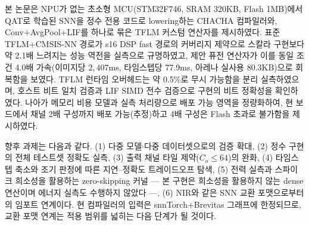 \label{sec:conclusion}

본 논문은 NPU가 없는 초소형 MCU(STM32F746, SRAM 320KB, Flash
1MB)에서 QAT로 학습된 SNN을 정수 전용 코드로 lowering하는
CHACHA 컴파일러와, Conv+AvgPool+LIF를 하나로 묶은 TFLM 커스텀 연산자를
제시하였다. 표준 TFLM+CMSIS-NN 경로가 s16 DSP fast 경로의 커버리지
제약으로 스칼라 구현보다 약 2.1배 느려지는 성능 역전을 실측으로
규명하였고, 제안 퓨전 연산자가 이를 동일 조건 4.0배 가속(이미지당
$2{,}407$ms, 타임스텝당 77.9ms, 아레나 실사용 80.3KB)으로 회복함을
보였다. TFLM 런타임 오버헤드는 약 0.5\%로 무시 가능함을 분리
실측하였으며, 호스트 비트 일치 검증과 LIF SIMD 전수 검증으로 구현의
비트 정확성을 확인하였다. 나아가 메모리 비용 모델과 실측 처리량으로
배포 가능 영역을 정량화하여, 현 보드에서 채널 2배 구성까지 배포
가능(추정)하고 4배 구성은 Flash 초과로 불가함을 제시하였다.

향후 과제는 다음과 같다. (1) 다중 모델$\cdot$다중 데이터셋으로의 검증
확대, (2) 정수 구현의 전체 테스트셋 정확도 실측, (3) 출력 채널 타일
제약($C_o\le64$)의 완화, (4) 타임스텝 축소와 조기 판정에 따른
지연--정확도 트레이드오프 탐색, (5) 전력 실측과 스파이크 희소성을
활용하는 zero-skipping 커널 --- 본 구현은 희소성을 활용하지 않는
dense 연산이며 에너지 실측도 수행하지 않았다 ---, (6)
NIR\cite{pedersen2024nir}와 같은 SNN 교환 포맷으로부터의 임포트
연계이다. 현 컴파일러의 입력은 snnTorch+Brevitas 그래프에 한정되므로,
교환 포맷 연계는 적용 범위를 넓히는 다음 단계가 될 것이다.
